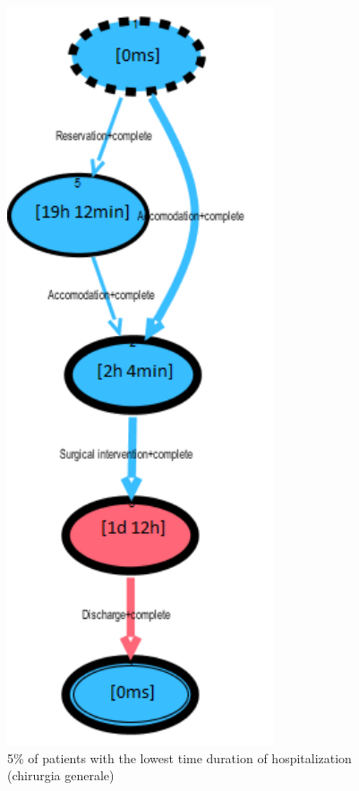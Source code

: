 \begin{figure} [htbp]
\begin{minipage}[t]{0.3\textwidth}
\includegraphics[width=0.7\textwidth]{RicoveriTransitionSystemSojourn0901Fast}
\caption{5\% of patients with the lowest time duration of hospitalization (chirurgia generale)}
\end{minipage}

\end{figure}

